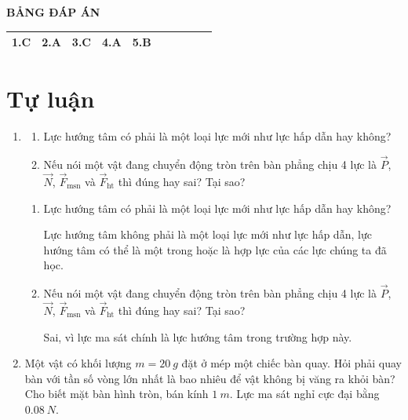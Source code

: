 \hideall
{
	\begin{center}
		\textbf{BẢNG ĐÁP ÁN}
	\end{center}
	\begin{center}
		\begin{tabular}{|m{2.8em}|m{2.8em}|m{2.8em}|m{2.8em}|m{2.8em}|m{2.8em}|m{2.8em}|m{2.8em}|m{2.8em}|m{2.8em}|}
			\hline
			1.C  & 2.A  & 3.C  & 4.A  & 5.B  &  &   &   &  &  \\
			\hline
		
		\end{tabular}
	\end{center}
}
\section{Tự luận}
\begin{enumerate}[label=\bfseries Câu \arabic*:]

	\item {}
	
	
	{
		\begin{enumerate}
			\item Lực hướng tâm có phải là một loại lực mới như lực hấp dẫn hay không?
			\item Nếu nói một vật đang chuyển động tròn trên bàn phẳng chịu 4 lực là $\vec P$, $\vec N$, $\vec F_\text{msn}$ và $\vec F_\text{ht}$ thì đúng hay sai? Tại sao?
		\end{enumerate}
	}
	
	\hideall
	{	
		\begin{enumerate}
			\item Lực hướng tâm có phải là một loại lực mới như lực hấp dẫn hay không?
			
			Lực hướng tâm không phải là một loại lực mới như lực hấp dẫn, lực hướng tâm có thể là một trong hoặc là hợp lực của các lực chúng ta đã học.
			
			\item Nếu nói một vật đang chuyển động tròn trên bàn phẳng chịu 4 lực là $\vec P$, $\vec N$, $\vec F_\text{msn}$ và $\vec F_\text{ht}$ thì đúng hay sai? Tại sao?
			
			Sai, vì lực ma sát chính là lực hướng tâm trong trường hợp này.
		\end{enumerate}
	}
	\item {}
	
	
	{
		Một vật có khối lượng $m=\SI{20}{g}$ đặt ở mép một chiếc bàn quay. Hỏi phải quay bàn với tần số vòng lớn nhất là bao nhiêu để vật không bị văng ra khỏi bàn? Cho biết mặt bàn hình tròn, bán kính $\SI{1}{m}$. Lực ma sát nghỉ cực đại bằng $\SI{0.08}{N}$.
	}
	

\end{enumerate}
